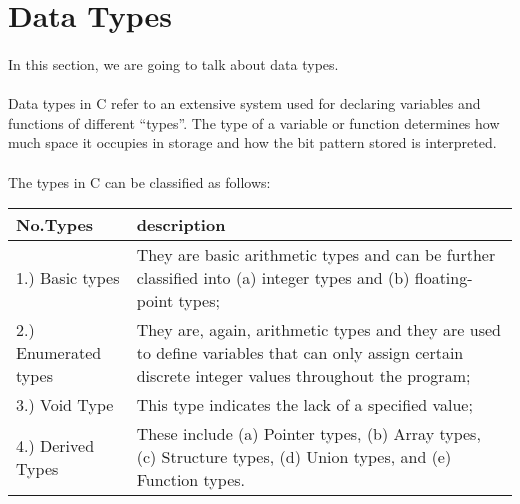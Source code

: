 \section{Data Types}

\paragraph{}
   In this section, we are going to talk about data types.

\paragraph{}
   \begin{displayquote}
      Data types in C refer to an extensive system used for declaring variables and functions of different ``types''. The type of a variable or
      function determines how much space it occupies in storage and how the bit pattern stored is interpreted.
   \end{displayquote}

\paragraph{}
   The types in C can be classified as follows:
   \begin{center}
      \begin{tabular}{ ||p{2in}| p{4in}|| }
         \hline
         No.Types & description\\ [1.5ex]
         \hline\hline
         1.) Basic types & They are basic arithmetic types and can be further classified into (a) integer types and (b) floating-point types;\\
         \hline
         2.) Enumerated types & They are, again, arithmetic types and they are used to define variables that can only assign certain discrete integer
         values throughout the program;\\
         \hline
         3.) Void Type & This type indicates the lack of a specified value;\\
         \hline
         4.) Derived Types & These include (a) Pointer types, (b) Array types, (c) Structure types, (d) Union types, and (e) Function types.\\
         \hline
      \end{tabular}
   \end{center}

\newpage

